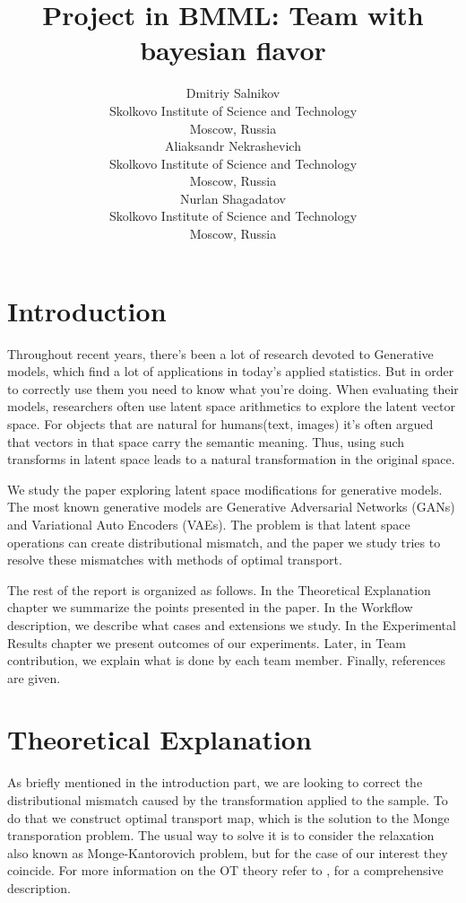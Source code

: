 \documentclass{article}
\title{Project in BMML: Team with bayesian flavor}
\author{
   \And
  Dmitriy Salnikov   \\
  Skolkovo Institute of Science and Technology \\
  Moscow, Russia \\
   \And
  Aliaksandr Nekrashevich \\
  Skolkovo Institute of Science and Technology \\
  Moscow, Russia \\
   \And
  Nurlan Shagadatov\\
  Skolkovo Institute of Science and Technology \\
  Moscow, Russia \\
}
\begin{document}
\maketitle



\section{Introduction}

Throughout recent years, there's been a lot of research devoted to Generative models, which find a lot of applications in today's applied statistics. But in order to correctly use them you need to know what you're doing.
When evaluating their models, researchers often use latent space arithmetics to explore the latent vector space. For objects that are natural for humans(text, images) it's often argued that vectors in that space carry the semantic meaning. Thus, using such transforms in latent space leads to a natural transformation in the original space.

We study the paper \cite{main} 
exploring latent space modifications 
for generative models. The most known generative models 
are Generative Adversarial Networks (GANs) and Variational 
Auto Encoders (VAEs). The problem is that latent space operations
can create distributional mismatch, and the paper we study 
tries to resolve these mismatches with methods of 
optimal transport.

The rest of the report is organized as follows. In the 
Theoretical Explanation chapter we summarize the points presented
in the paper. In the Workflow description, we describe what 
cases and extensions we study. In the Experimental Results
chapter we present outcomes of our experiments.
Later, in Team contribution, we explain what is done by each team member. Finally, references are given.


\section{Theoretical Explanation}
As briefly mentioned in the introduction part, we are looking to correct the distributional mismatch caused by the transformation applied to the sample. To do that we construct optimal transport map, which is the solution to the Monge transporation problem. The usual way to solve it is to consider the relaxation also known as Monge-Kantorovich problem, but for the case of our interest they coincide. For more information on the OT theory refer to \cite{villani2008optimal}, \cite{peyre2017computational} for a comprehensive description. 
\end{document}
